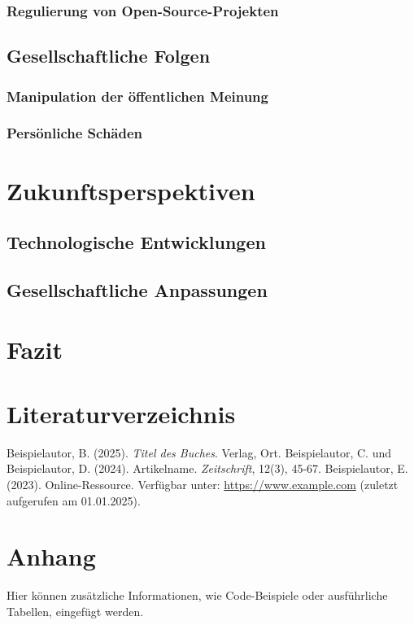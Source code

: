 \documentclass[a4paper,12pt]{article}
\begin{document}
\subsubsection{Regulierung von Open-Source-Projekten}
\subsection{Gesellschaftliche Folgen}
\subsubsection{Manipulation der öffentlichen Meinung}
\subsubsection{Persönliche Schäden}
\newpage
\section{Zukunftsperspektiven}
\subsection{Technologische Entwicklungen}
\subsection{Gesellschaftliche Anpassungen}
\newpage
\section{Fazit}



\newpage
{}
\section*{Literaturverzeichnis}
\begin{thebibliography}{99}
     Beispielautor, B. (2025). \textit{Titel des Buches}. Verlag, Ort.
     Beispielautor, C. und Beispielautor, D. (2024). Artikelname. \textit{Zeitschrift}, 12(3), 45-67.
     Beispielautor, E. (2023). Online-Ressource. Verfügbar unter: \url{https://www.example.com} (zuletzt aufgerufen am 01.01.2025).
\end{thebibliography}

\newpage
\appendix
\section{Anhang}
Hier können zusätzliche Informationen, wie Code-Beispiele oder ausführliche Tabellen, eingefügt werden.
\end{document}
